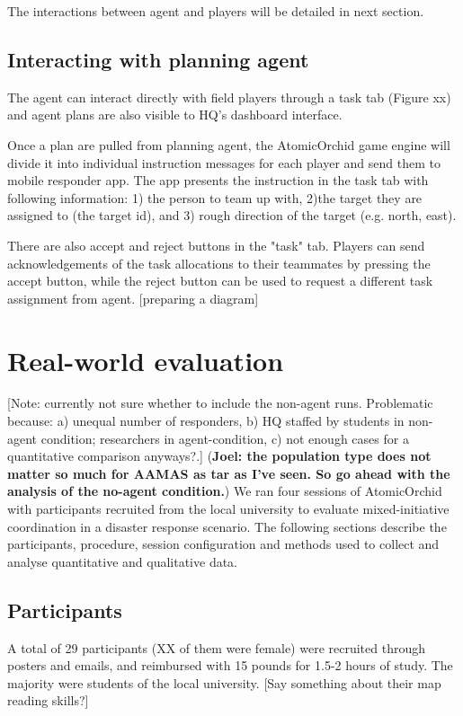 The interactions between agent and players will be detailed in next section.
\subsection{Interacting with planning agent}
The agent can interact directly with field players through a task tab (Figure xx) and agent plans are also visible to HQ's dashboard interface.

Once a plan are pulled from planning agent, the AtomicOrchid game engine will divide it into individual instruction messages for each player and send them to mobile responder app. The app presents the instruction in the task tab with following information: 1) the person to team up with, 2)the target they are assigned to (the target id), and 3) rough direction of the target (e.g. north, east). 

There are also accept and reject buttons in the "task" tab. Players can send acknowledgements of the task allocations to their teammates by pressing the accept button, while the reject button can be used to request a different task assignment from agent. [preparing a diagram]
 





\section{Real-world evaluation}
[Note: currently not sure whether to include the non-agent runs. Problematic because: a) unequal number of responders, b) HQ staffed by students in non-agent condition; researchers in agent-condition, c) not enough cases for a quantitative comparison anyways?.]
(\textbf{Joel: the population type does not matter so much for AAMAS as tar as I've seen. So go ahead with the analysis of the no-agent condition.})
We ran four sessions of AtomicOrchid with participants recruited from the local university to evaluate mixed-initiative coordination in a disaster response scenario. The following sections describe the participants, procedure, session configuration and methods used to collect and analyse quantitative and qualitative data.

\subsection{Participants}
A total of 29 participants (XX of them were female) were recruited through posters and emails, and reimbursed with 15 pounds for 1.5-2 hours of study. The majority were students of the local university. [Say something about their map reading skills?]

